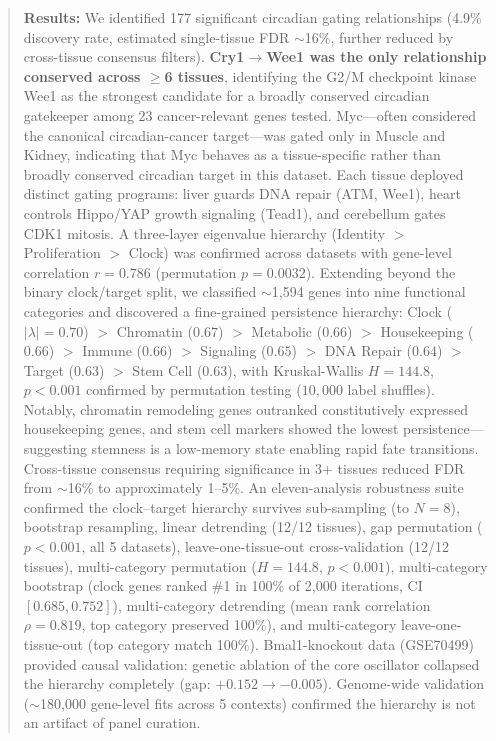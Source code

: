 \documentclass[11pt,letterpaper]{article}
\begin{document}
\begin{abstract}
\noindent\textbf{Results:} We identified 177 significant circadian gating relationships (4.9\% discovery rate, estimated single-tissue FDR $\sim$16\%, further reduced by cross-tissue consensus filters). \textbf{Cry1$\rightarrow$Wee1 was the only relationship conserved across $\geq$6 tissues}, identifying the G2/M checkpoint kinase Wee1 as the strongest candidate for a broadly conserved circadian gatekeeper among 23 cancer-relevant genes tested. Myc---often considered the canonical circadian-cancer target---was gated only in Muscle and Kidney, indicating that Myc behaves as a tissue-specific rather than broadly conserved circadian target in this dataset. Each tissue deployed distinct gating programs: liver guards DNA repair (ATM, Wee1), heart controls Hippo/YAP growth signaling (Tead1), and cerebellum gates CDK1 mitosis. A three-layer eigenvalue hierarchy (Identity $>$ Proliferation $>$ Clock) was confirmed across datasets with gene-level correlation $r = 0.786$ (permutation $p = 0.0032$). Extending beyond the binary clock/target split, we classified $\sim$1,594 genes into nine functional categories and discovered a fine-grained persistence hierarchy: Clock ($|\lambda|=0.70$) $>$ Chromatin ($0.67$) $>$ Metabolic ($0.66$) $>$ Housekeeping ($0.66$) $>$ Immune ($0.66$) $>$ Signaling ($0.65$) $>$ DNA Repair ($0.64$) $>$ Target ($0.63$) $>$ Stem Cell ($0.63$), with Kruskal-Wallis $H=144.8$, $p<0.001$ confirmed by permutation testing ($10{,}000$ label shuffles). Notably, chromatin remodeling genes outranked constitutively expressed housekeeping genes, and stem cell markers showed the lowest persistence---suggesting stemness is a low-memory state enabling rapid fate transitions. Cross-tissue consensus requiring significance in 3+ tissues reduced FDR from $\sim$16\% to approximately 1--5\%. An eleven-analysis robustness suite confirmed the clock--target hierarchy survives sub-sampling (to $N=8$), bootstrap resampling, linear detrending (12/12 tissues), gap permutation ($p < 0.001$, all 5 datasets), leave-one-tissue-out cross-validation (12/12 tissues), multi-category permutation ($H=144.8$, $p<0.001$), multi-category bootstrap (clock genes ranked \#1 in 100\% of 2,000 iterations, CI $[0.685, 0.752]$), multi-category detrending (mean rank correlation $\rho=0.819$, top category preserved 100\%), and multi-category leave-one-tissue-out (top category match 100\%). Bmal1-knockout data (GSE70499) provided causal validation: genetic ablation of the core oscillator collapsed the hierarchy completely (gap: $+0.152 \rightarrow -0.005$). Genome-wide validation ($\sim$180,000 gene-level fits across 5 contexts) confirmed the hierarchy is not an artifact of panel curation.


\end{abstract}
\end{document}
